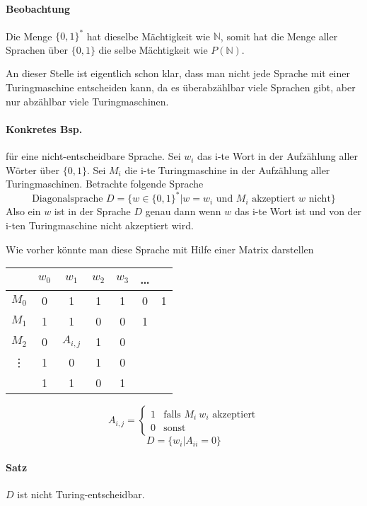 \paragraph*{Beobachtung} Die Menge $\{0,1\}^*$ hat dieselbe Mächtigkeit wie $\mathbb{N}$, somit hat die Menge aller Sprachen über $\{0,1\}$ die selbe Mächtigkeit wie $P(\mathbb{N})$.

\par\medskip An dieser Stelle ist eigentlich schon klar, dass man nicht jede Sprache mit einer Turingmaschine entscheiden kann, da es überabzählbar viele Sprachen gibt, aber nur abzählbar viele Turingmaschinen.\par\medskip

\paragraph*{Konkretes Bsp.} für eine nicht-entscheidbare Sprache. Sei $w_i$ das i-te Wort in der Aufzählung aller Wörter über $\{0,1\}$. Sei $M_i$ die i-te Turingmaschine in der Aufzählung aller Turingmaschinen. Betrachte folgende Sprache $$ \text{Diagonalsprache } D=\{ w\in\{0,1\}^*|w=w_i \text{ und } M_i \text{ akzeptiert } w \text{ nicht} \} $$ Also ein $w$ ist in der Sprache $D$ genau dann wenn $w$ das i-te Wort ist und von der i-ten Turingmaschine nicht akzeptiert wird.

\par\medskip Wie vorher könnte man diese Sprache mit Hilfe einer Matrix darstellen\par\medskip
\begin{table}[htb!]
\centering
\begin{tabular}{c|c c c c c c}
 & $w_0$ & $w_1$ & $w_2$ & $w_3$ & \dots & \\
\hline
$M_0$ & 0 & 1 & 1 & 1 & 0 & 1 \\
$M_1$ & 1 & 1 & 0 & 0 & 1 &  \\
$M_2$ & 0 & $A_{i,j}$ & 1 & 0 &  &  \\
\vdots & 1 & 0 & 1 & 0 &  &  \\
 & 1 & 1 & 0 & 1 &  &  \\
\end{tabular}
\end{table}
$$ A_{i,j} = \begin{cases}1&\text{falls } M_i\ w_i \text{ akzeptiert} \\ 0 & \text{sonst}\end{cases} $$
$$ D=\{ w_i | A_{ii}=0 \}$$

\paragraph*{Satz} $D$ ist nicht Turing-entscheidbar.

